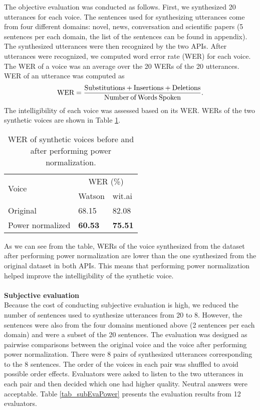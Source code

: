 \documentclass[12pt]{article}
\begin{document}
The objective evaluation was conducted as follows. First, we synthesized 20 utterances for each voice. The sentences used for synthesizing utterances come from four different domains: novel, news, conversation and scientific papers (5 sentences per each domain, the list of the sentences can be found in appendix). The synthesized utterances were then recognized by the two APIs. After utterances were recognized, we computed word error rate (WER) for each voice. The WER of a voice was an average over the 20 WERs of the 20 utterances. WER of an utterance was computed as
\begin{equation}\label{exp_wer}
    \text{WER} = \frac{\text{Substitutions} + \text{Insertions} + \text{Deletions}}{\text{Number\:of\:Words\:Spoken}}.
\end{equation}
The intelligibility of each voice was assessed based on its WER. WERs of the two synthetic voices are shown in Table \ref{tab_werPower}.

\begin{table}[]
\begin{center}
\caption{WER of synthetic voices before and after performing power normalization.}
\label{tab_werPower}
\vspace{3mm}
\begin{tabular}{|l|l|l|}
\hline
\multirow{2}{3.5cm}{Voice} &
\multicolumn{2}{c|}{WER (\%)} \\ \cline{2-3}
& Watson & wit.ai \\
\hline
Original           & 68.15          & 82.08 \\
Power normalized   & \textbf{60.53} & \textbf{75.51} \\
\hline
\end{tabular}
\end{center}
\end{table}

As we can see from the table, WERs of the voice synthesized from the dataset after performing power normalization are lower than the one synthesized from the original dataset in both APIs. This means that performing power normalization helped improve the intelligibility of the synthetic voice.\\\\
\textbf{Subjective evaluation}
\vspace{0.28cm}\\
Because the cost of conducting subjective evaluation is high, we reduced the number of sentences used to synthesize utterances from 20 to 8. However, the sentences were also from the four domains mentioned above (2 sentences per each domain) and were a subset of the 20 sentences. The evaluation was designed as pairwise comparisons between the original voice and the voice after performing power normalization. There were 8 pairs of synthesized utterances corresponding to the 8 sentences. The order of the voices in each pair was shuffled to avoid possible order effects. Evaluators were asked to listen to the two utterances in each pair and then decided which one had higher quality. Neutral answers were acceptable. Table \ref{tab_subEvaPower} presents the evaluation results from 12 evaluators.
\end{document}
